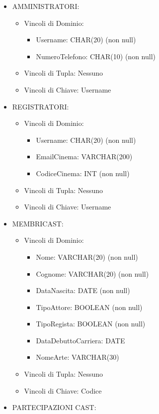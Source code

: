 \documentclass[a4paper,12pt]{report}
\begin{document}
\begin{itemize}
\begin{itemize}
	\end{itemize}
	\item AMMINISTRATORI:
	\begin{itemize}
		\item Vincoli di Dominio:
		\begin{itemize}
			\item Username: CHAR(20) (non null)
			\item NumeroTelefono: CHAR(10) (non null)
		\end{itemize}
		\item Vincoli di Tupla: Nessuno
		\item Vincoli di Chiave: Username
	\end{itemize}
	\item REGISTRATORI:
	\begin{itemize}
		\item Vincoli di Dominio:
		\begin{itemize}
			\item Username: CHAR(20) (non null)
			\item EmailCinema: VARCHAR(200)
			\item CodiceCinema: INT (non null)
		\end{itemize}
		\item Vincoli di Tupla: Nessuno
		\item Vincoli di Chiave: Username
	\end{itemize}
	\item MEMBRICAST:
	\begin{itemize}
		\item Vincoli di Dominio:
		\begin{itemize}
			\item Nome: VARCHAR(20) (non null)
			\item Cognome: VARCHAR(20) (non null)
			\item DataNascita: DATE (non null)
			\item TipoAttore: BOOLEAN (non null)
			\item TipoRegista: BOOLEAN (non null)
			\item DataDebuttoCarriera: DATE
			\item NomeArte: VARCHAR(30)	
		\end{itemize}
		\item Vincoli di Tupla: Nessuno
		\item Vincoli di Chiave: Codice
	\end{itemize}
	\item PARTECIPAZIONI CAST:
	\begin{itemize}

\end{itemize}
\end{itemize}
\end{document}
